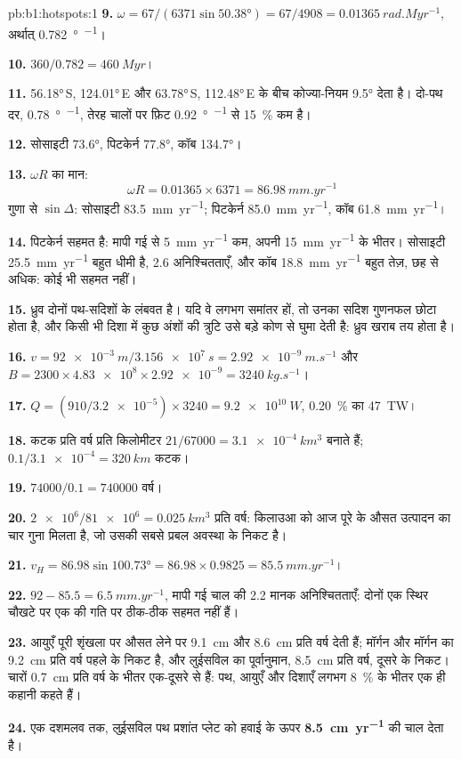 \begin{solution}{pb:b1:hotspots:1}
\textbf{9.} $\omega = 67/(6371\sin\ang{50.38}) = 67/4908 =
\qty{0.01365}{rad.Myr^{-1}}$, अर्थात् \qty{0.782}{\degree\per\Myr}।

\textbf{10.} $360/0.782 = \qty{460}{Myr}$।

\textbf{11.} \ang{56.18}\,S, \ang{124.01}\,E और \ang{63.78}\,S, \ang{112.48}\,E के बीच कोज्या-नियम \ang{9.5} देता है। दो-पथ दर, \qty{0.78}{\degree\per\Myr}, तेरह चालों पर फ़िट \qty{0.92}{\degree\per\Myr} से \qty{15}{\percent} कम है।

\textbf{12.} सोसाइटी \ang{73.6}, पिटकेर्न \ang{77.8}, कॉब \ang{134.7}।

\textbf{13.} $\omega R$ का मान:
\[ \omega R = 0.01365\times6371 = \qty{86.98}{mm.yr^{-1}} \]
गुणा से $\sin\Delta$:
सोसाइटी \qty{83.5}{mm.yr^{-1}};
पिटकेर्न \qty{85.0}{mm.yr^{-1}}, कॉब \qty{61.8}{mm.yr^{-1}}।

\textbf{14.} पिटकेर्न सहमत है: मापी गई से \qty{5}{mm.yr^{-1}} कम, अपनी \qty{15}{mm.yr^{-1}} के भीतर। सोसाइटी \qty{25.5}{mm.yr^{-1}} बहुत धीमी है, 2.6 अनिश्चितताएँ, और कॉब \qty{18.8}{mm.yr^{-1}} बहुत तेज़, छह से अधिक: कोई भी सहमत नहीं।

\textbf{15.} ध्रुव दोनों पथ-सदिशों के लंबवत है। यदि वे लगभग समांतर हों, तो उनका सदिश गुणनफल छोटा होता है, और किसी भी दिशा में कुछ अंशों की त्रुटि उसे बड़े कोण से घुमा देती है: ध्रुव खराब तय होता है।

\textbf{16.} $v = \qty{92e-3}{m}/\qty{3.156e7}{s} = \qty{2.92e-9}{m.s^{-1}}$
और $B = 2300\times\num{4.83e8}\times\num{2.92e-9} = \qty{3240}{kg.s^{-1}}$।

\textbf{17.} $Q = (910/\num{3.2e-5})\times3240 = \qty{9.2e10}{W}$,
\qty{0.20}{\percent} का \qty{47}{TW}।

\textbf{18.} कटक प्रति वर्ष प्रति किलोमीटर $21/67000 = \qty{3.1e-4}{km^3}$ बनाते हैं; $0.1/\num{3.1e-4} = \qty{320}{km}$ कटक।

\textbf{19.} $74000/0.1 = \num{740000}$ वर्ष।

\textbf{20.} $\num{2e6}/\num{81e6} = \qty{0.025}{km^3}$ प्रति वर्ष: किलाउआ को आज पूरे  के औसत उत्पादन का चार गुना मिलता है, जो उसकी सबसे प्रबल अवस्था के निकट है।

\textbf{21.} $v_H = 86.98\sin\ang{100.73} = 86.98\times0.9825 =
\qty{85.5}{mm.yr^{-1}}$।

\textbf{22.} $92 - 85.5 = \qty{6.5}{mm.yr^{-1}}$, मापी गई चाल की 2.2 मानक अनिश्चितताएँ: दोनों  एक स्थिर चौखटे पर एक  की गति पर ठीक-ठीक सहमत नहीं हैं।

\textbf{23.} आयुएँ पूरी शृंखला पर औसत लेने पर \qty{9.1}{cm} और \qty{8.6}{cm} प्रति वर्ष देती हैं; मॉर्गन और मॉर्गन का \qty{9.2}{cm} प्रति वर्ष पहले के निकट है, और लुईसविल का पूर्वानुमान, \qty{8.5}{cm} प्रति वर्ष, दूसरे के निकट। चारों \qty{0.7}{cm} प्रति वर्ष के भीतर एक-दूसरे से हैं: पथ, आयुएँ और दिशाएँ लगभग \qty{8}{\percent} के भीतर एक ही कहानी कहते हैं।

\textbf{24.} एक दशमलव तक, लुईसविल पथ प्रशांत प्लेट को हवाई  के ऊपर \textbf{\qty[text-series-to-math=true]{8.5}{cm.yr^{-1}}} की चाल देता है।
\end{solution}
